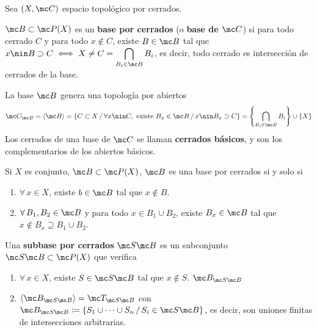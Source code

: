 Sea $(X,\mc C)$ espacio topol\'ogico por cerrados. \begin{defi}
    $\mc B \subset \mc P(X)$ es un \textbf{base por cerrados} (o \textbf{base de $\mc C$}) si para todo cerrado $C$ y para todo $x\nin C$, existe $B \in \mc B$ tal que $x\nin B \supset C \iff X \neq C =\displaystyle \bigcap_{B_i \in \mc B} B_i$, es decir, todo cerrado es intersecci\'on de cerrados de la base. 
\end{defi}
\begin{defi} La base $\mc B$ genera una topolog\'ia por abiertos 
    $$\mc C_{\mc B} = \langle \mc B \rangle= \{C \subset X \, / \, \forall x \nin C, \text{ existe } B_x \in \mc B \, / \, x \nin B_x \supset C\}  =\left\{\bigcap_{B_i \in \mc B} B_i \right\}\cup \{X\}$$
    Los cerrados de una base de $\mc C$ se llaman \textbf{cerrados básicos}, y son los complementarios de los abiertos b\'asicos.

\end{defi}
\begin{prop}
Si $X$ es conjunto, $\mc B \subset \mc P(X)$, $\mc B$ es una base por cerrados si y solo si
\begin{enumerate}
    \item $\forall\, x\in X$, existe $b\in \mc B$ tal que $x\nin B$.
    \item $\forall \, B_1,B_2 \in \mc B$ y para todo $x \in B_1\cup B_2$, existe $B_x \in \mc B$ tal que $x \nin B_x \supseteq B_1 \cup B_2$.
\end{enumerate}
\end{prop}
\begin{defi}
    Una \textbf{subbase por cerrados} $\mc S \mc B$ es un subconjunto $\mc S \mc B\subset \mc P(X)$ que verifica 
    \begin{enumerate}
        \item $\forall \, x\in X$, existe $S\in \mc S \mc B$ tal que $x\nin S$. $\mc B_{\mc S \mc B}$
        \item $\langle \mc B_{\mc S \mc B} \rangle = \mc T_{\mc S \mc B}$ con $\mc B_{\mc S \mc B} \coloneqq \{S_1\cup \cdots \cup S_n \, / \,S_i\in \mc S \mc B\}$, es decir, son uniones finitas de intersecciones arbitrarias. 
    \end{enumerate}
\end{defi}
